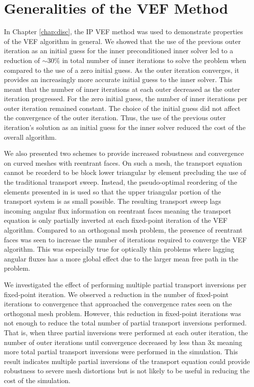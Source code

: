 \documentclass[../doc.tex]{subfiles}
\begin{document}
\section{Generalities of the VEF Method}
In Chapter \ref{chap:disc}, the IP VEF method was used to demonstrate properties of the VEF algorithm in general. We showed that the use of the previous outer iteration as an initial guess for the inner preconditioned inner solver led to a reduction of $\sim 30\%$ in total number of inner iterations to solve the problem when compared to the use of a zero initial guess.
As the outer iteration converges, it provides an increasingly more accurate initial guess to the inner solver. This meant that the number of inner iterations at each outer decreased as the outer iteration progressed. For the zero initial guess, the number of inner iterations per outer iteration remained constant. 
The choice of the initial guess did not affect the convergence of the outer iteration. Thus, the use of the previous outer iteration's solution as an initial guess for the inner solver reduced the cost of the overall algorithm. 

We also presented two schemes to provide increased robustness and convergence on curved meshes with reentrant faces. On such a mesh, the transport equation cannot be reorderd to be block lower triangular by element precluding the use of the traditional transport sweep. Instead, the pseudo-optimal reordering of the elements presented in \textcite{graph_sweeps} is used so that the upper triangular portion of the transport system is as small possible. The resulting transport sweep lags incoming angular flux information on reentrant faces meaning the transport equation is only partially inverted at each fixed-point iteration of the VEF algorithm. Compared to an orthogonal mesh problem, the presence of reentrant faces was seen to increase the number of iterations required to converge the VEF algorithm. This was especially true for optically thin problems where lagging angular fluxes has a more global effect due to the larger mean free path in the problem. 

We investigated the effect of performing multiple partial transport inversions per fixed-point iteration. We observed a reduction in the number of fixed-point iterations to convergence that approached the convergence rates seen on the orthogonal mesh problem. However, this reduction in fixed-point iterations was not enough to reduce the total number of partial transport inversions performed. That is, when three partial inversions were performed at each outer iteration, the number of outer iterations until convergence decreased by less than 3x meaning more total partial transport inversions were performed in the simulation. This result indicates multiple partial inversions of the transport equation could provide robustness to severe mesh distortions but is not likely to be useful in reducing the cost of the simulation. 
\end{document}
